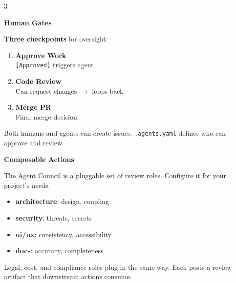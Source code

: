 \documentclass[11pt,letterpaper]{article}
\begin{document}
\begin{multicols}{3}
\raggedright\small

\textcolor{humangate}{\Large\textbf{Human Gates}}
\vspace{0.3em}

\textbf{Three checkpoints} for oversight:

\begin{enumerate}[label=\textbf{\arabic*.}, leftmargin=1.5em, itemsep=0.3em]
  \item \textbf{Approve Work}\\
        {\small \texttt{[Approved]} triggers agent}
  \item \textbf{Code Review}\\
        {\small Can request changes $\rightarrow$ loops back}
  \item \textbf{Merge PR}\\
        {\small Final merge decision}
\end{enumerate}

\vspace{0.3em}

{\small Both humans and agents can create issues. \texttt{.agents.yaml} defines who can approve and review.}

\vspace{0.5em}
\textcolor{reviewloop}{\Large\textbf{Composable Actions}}
\vspace{0.3em}

The Agent Council is a pluggable set of review roles. Configure it for your project's needs:

\begin{itemize}[leftmargin=1.2em, itemsep=0.1em]
  \item \textcolor{rolearch}{\textbf{architecture}}: {\small design, coupling}
  \item \textcolor{kanban}{\textbf{security}}: {\small threats, secrets}
  \item \textcolor{roleux}{\textbf{ui/ux}}: {\small consistency, accessibility}
  \item \textcolor{darktext!70}{\textbf{docs}}: {\small accuracy, completeness}
\end{itemize}

\vspace{0.2em}
{\small Legal, cost, and compliance roles plug in the same way. Each posts a review artifact that downstream actions consume.}

\columnbreak


\end{multicols}
\end{document}
